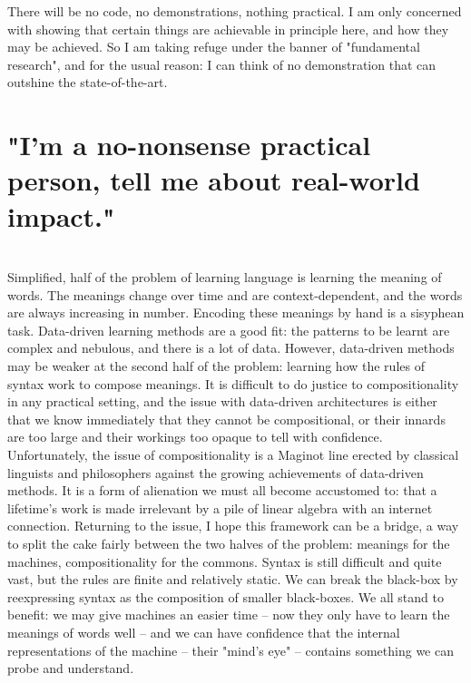 There will be no code, no demonstrations, nothing practical. I am only concerned with showing that certain things are achievable in principle here, and how they may be achieved. So I am taking refuge under the banner of "fundamental research", and for the usual reason: I can think of no demonstration that can outshine the state-of-the-art.

\section{"I'm a no-nonsense practical person, tell me about real-world impact."}
\\
Simplified, half of the problem of learning language is learning the meaning of words. The meanings change over time and are  context-dependent, and the words are always increasing in number. Encoding these meanings by hand is a sisyphean task. Data-driven learning methods are a good fit: the patterns to be learnt are complex and nebulous, and there is a lot of data. However, data-driven methods may be weaker at the second half of the problem: learning how the rules of syntax work to compose meanings. It is difficult to do justice to compositionality in any practical setting, and the issue with data-driven architectures is either that we know immediately that they cannot be compositional, or their innards are too large and their workings too opaque to tell with confidence. Unfortunately, the issue of compositionality is a Maginot line erected by classical linguists and philosophers against the growing achievements of data-driven methods. It is a form of alienation we must all become accustomed to: that a lifetime's work is made irrelevant by a pile of linear algebra with an internet connection. Returning to the issue, I hope this framework can be a bridge, a way to split the cake fairly between the two halves of the problem: meanings for the machines, compositionality for the commons. Syntax is still difficult and quite vast, but the rules are finite and relatively static. We can break the black-box by reexpressing syntax as the composition of smaller black-boxes. We all stand to benefit: we may give machines an easier time -- now they only have to learn the meanings of words well -- and we can have confidence that the internal representations of the machine -- their "mind's eye" -- contains something we can probe and understand.

